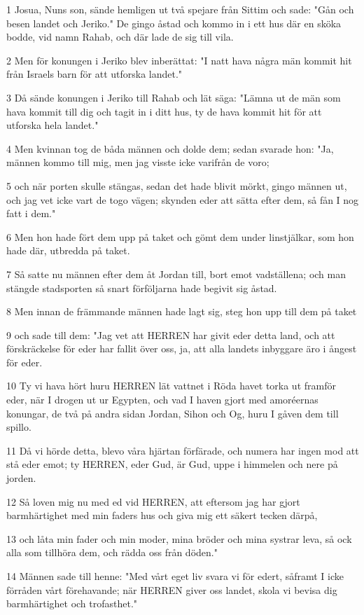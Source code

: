 \par 1 Josua, Nuns son, sände hemligen ut två spejare från Sittim och sade: "Gån och besen landet och Jeriko." De gingo åstad och kommo in i ett hus där en sköka bodde, vid namn Rahab, och där lade de sig till vila.
\par 2 Men för konungen i Jeriko blev inberättat: "I natt hava några män kommit hit från Israels barn för att utforska landet."
\par 3 Då sände konungen i Jeriko till Rahab och lät säga: "Lämna ut de män som hava kommit till dig och tagit in i ditt hus, ty de hava kommit hit för att utforska hela landet."
\par 4 Men kvinnan tog de båda männen och dolde dem; sedan svarade hon: "Ja, männen kommo till mig, men jag visste icke varifrån de voro;
\par 5 och när porten skulle stängas, sedan det hade blivit mörkt, gingo männen ut, och jag vet icke vart de togo vägen; skynden eder att sätta efter dem, så fån I nog fatt i dem."
\par 6 Men hon hade fört dem upp på taket och gömt dem under linstjälkar, som hon hade där, utbredda på taket.
\par 7 Så satte nu männen efter dem åt Jordan till, bort emot vadställena; och man stängde stadsporten så snart förföljarna hade begivit sig åstad.
\par 8 Men innan de främmande männen hade lagt sig, steg hon upp till dem på taket
\par 9 och sade till dem: "Jag vet att HERREN har givit eder detta land, och att förskräckelse för eder har fallit över oss, ja, att alla landets inbyggare äro i ångest för eder.
\par 10 Ty vi hava hört huru HERREN lät vattnet i Röda havet torka ut framför eder, när I drogen ut ur Egypten, och vad I haven gjort med amoréernas konungar, de två på andra sidan Jordan, Sihon och Og, huru I gåven dem till spillo.
\par 11 Då vi hörde detta, blevo våra hjärtan förfärade, och numera har ingen mod att stå eder emot; ty HERREN, eder Gud, är Gud, uppe i himmelen och nere på jorden.
\par 12 Så loven mig nu med ed vid HERREN, att eftersom jag har gjort barmhärtighet med min faders hus och giva mig ett säkert tecken därpå,
\par 13 och låta min fader och min moder, mina bröder och mina systrar leva, så ock alla som tillhöra dem, och rädda oss från döden."
\par 14 Männen sade till henne: "Med vårt eget liv svara vi för edert, såframt I icke förråden vårt förehavande; när HERREN giver oss landet, skola vi bevisa dig barmhärtighet och trofasthet."
